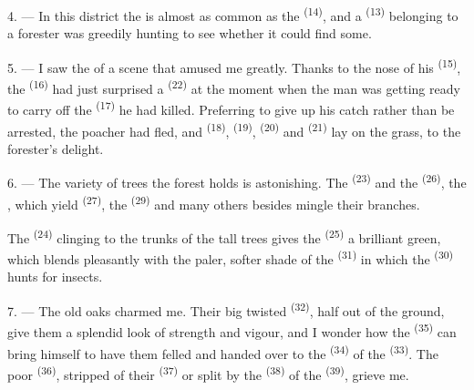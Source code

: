 4. --- In this district the  is almost as common as the
 \textsuperscript{(14)}, and a  \textsuperscript{(13)}
belonging to a forester was greedily hunting to see whether it could find
some.

\VUsaut{3.0mm}
\VUsaut{3.0mm}

5. --- I saw the  of a scene that amused me greatly. Thanks to
the nose of his  \textsuperscript{(15)}, the 
\textsuperscript{(16)} had just surprised a  \textsuperscript{(22)} at the
moment when the man was getting ready to carry off the 
\textsuperscript{(17)} he had killed. Preferring to give up his catch rather than
be arrested, the poacher had fled, and  \textsuperscript{(18)},
 \textsuperscript{(19)},  \textsuperscript{(20)} and
 \textsuperscript{(21)} lay on the grass, to the forester's
delight.

6. --- The variety of trees the forest holds is astonishing. The
 \textsuperscript{(23)} and the  \textsuperscript{(26)}, the
, which yield  \textsuperscript{(27)}, the 
\textsuperscript{(29)} and many others besides mingle their branches.

The  \textsuperscript{(24)} clinging to the trunks of the tall trees
gives the  \textsuperscript{(25)} a brilliant green, which blends
pleasantly with the paler, softer shade of the  \textsuperscript{(31)}
in which the  \textsuperscript{(30)} hunts for insects.

\VUsaut{3.0mm}
\VUsaut{3.0mm}

7. --- The old oaks charmed me. Their big twisted 
\textsuperscript{(32)}, half out of the ground, give them a splendid look of
strength and vigour, and I wonder how the  \textsuperscript{(35)} can
bring himself to have them felled and handed over to the
 \textsuperscript{(34)} of the  \textsuperscript{(33)}. The
poor  \textsuperscript{(36)}, stripped of their 
\textsuperscript{(37)} or split by the  \textsuperscript{(38)} of the
 \textsuperscript{(39)}, grieve me.

